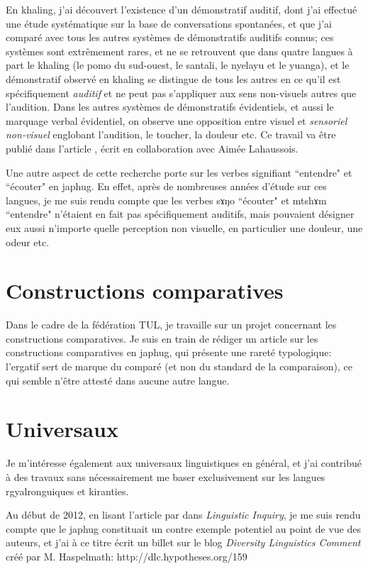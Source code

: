 \documentclass[oldfontcommands,oneside,a4paper,11pt]{memoir}
\newcommand{\ipa}[1]{{\phon #1}} %
\begin{document}
En khaling, j'ai découvert l'existence d'un démonstratif auditif, dont j'ai effectué une étude systématique sur la base de conversations spontanées, et que j'ai comparé avec tous les autres systèmes de démonstratifs auditifs connus; ces systèmes sont extrêmement rares, et ne se retrouvent que dans quatre langues à part le khaling (le pomo du sud-ouest, le santali, le nyelayu et le yuanga), et le démonstratif observé en khaling se distingue de tous les autres en ce qu'il est spécifiquement \textit{auditif} et ne peut pas s'appliquer aux sens non-visuels autres que l'audition. Dans les autres systèmes de démonstratifs évidentiels, et aussi le marquage verbal évidentiel, on observe une opposition entre visuel et \textit{sensoriel non-visuel} englobant l'audition, le toucher, la douleur etc.
Ce travail va être publié dans l'article \citet{jacques14auditory}, écrit en collaboration avec Aimée Lahaussois.

Une autre aspect de cette recherche porte sur les verbes signifiant ``entendre" et ``écouter" en japhug. En effet, après de nombreuses années d'étude sur ces langues, je me suis rendu compte que les verbes \ipa{sɤŋo} ``écouter" et \ipa{mtshɤm} ``entendre" n'étaient en fait pas spécifiquement auditifs, mais pouvaient désigner eux aussi n'importe quelle perception non visuelle, en particulier une douleur, une odeur etc.


\section{Constructions comparatives}
Dans le cadre de la fédération TUL, je travaille sur un projet concernant les constructions comparatives. Je suis en train de rédiger un article sur les constructions comparatives en japhug, qui présente une rareté typologique: l'ergatif sert de marque du comparé (et non du standard de la comparaison), ce qui semble n'être attesté dans aucune autre langue. 

\section{Universaux}
Je m'intéresse également aux universaux linguistiques en général, et j'ai contribué à des travaux sans nécessairement me baser exclusivement sur les langues rgyalronguiques et kiranties.

Au début de 2012, en lisant l'article \citet{harves12need} par dans \textit{Linguistic Inquiry}, je me suis rendu compte que le japhug constituait un contre exemple potentiel au point de vue des auteurs, et j'ai à ce titre écrit un billet sur le blog \textit{Diversity Linguistics Comment} créé par M. Haspelmath: http://dlc.hypotheses.org/159
\end{document}
